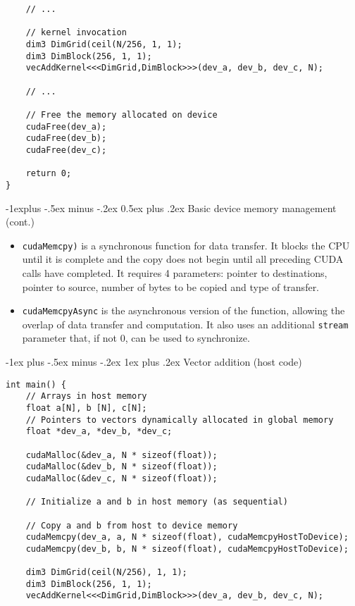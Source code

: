 \documentclass[10pt,landscape]{article}
\makeatletter
\renewcommand{\subsection}{\@startsection{subsection}{2}{0mm}%
                                {-1explus -.5ex minus -.2ex}%
                                {0.5ex plus .2ex}%
                                {\normalfont\normalsize\bfseries}}
\renewcommand{\subsubsection}{\@startsection{subsubsection}{3}{0mm}%
                                {-1ex plus -.5ex minus -.2ex}%
                                {1ex plus .2ex}%
                                {\normalfont\small\bfseries}}
\makeatother
\begin{document}
\begin{multicols}{3}
\begin{verbatim}
    // ...
    
    // kernel invocation
    dim3 DimGrid(ceil(N/256, 1, 1);
    dim3 DimBlock(256, 1, 1);
    vecAddKernel<<<DimGrid,DimBlock>>>(dev_a, dev_b, dev_c, N);
    
    // ...
    
    // Free the memory allocated on device
    cudaFree(dev_a);
    cudaFree(dev_b);
    cudaFree(dev_c);
    
    return 0;
}
\end{verbatim}
\subsection{Basic device memory management (cont.)}
\begin{itemize}
    \item \texttt{cudaMemcpy)} is a synchronous function for data transfer. It blocks the CPU until it is complete and the copy does not begin until all preceding CUDA calls have completed. It requires 4 parameters: pointer to destinations, pointer to source, number of bytes to be copied and type of transfer.
    \item \texttt{cudaMemcpyAsync} is the asynchronous version of the function, allowing the overlap of data transfer and computation. It also uses an additional \texttt{stream} parameter that, if not 0, can be used to synchronize.
\end{itemize}
\subsubsection{Vector addition (host code)}
\begin{verbatim}
int main() {
    // Arrays in host memory
    float a[N], b [N], c[N];
    // Pointers to vectors dynamically allocated in global memory
    float *dev_a, *dev_b, *dev_c;
    
    cudaMalloc(&dev_a, N * sizeof(float));
    cudaMalloc(&dev_b, N * sizeof(float));
    cudaMalloc(&dev_c, N * sizeof(float));
    
    // Initialize a and b in host memory (as sequential)
    
    // Copy a and b from host to device memory
    cudaMemcpy(dev_a, a, N * sizeof(float), cudaMemcpyHostToDevice);
    cudaMemcpy(dev_b, b, N * sizeof(float), cudaMemcpyHostToDevice);
    
    dim3 DimGrid(ceil(N/256), 1, 1);
    dim3 DimBlock(256, 1, 1);
    vecAddKernel<<<DimGrid,DimBlock>>>(dev_a, dev_b, dev_c, N);
    

\end{verbatim}
\end{multicols}
\end{document}
